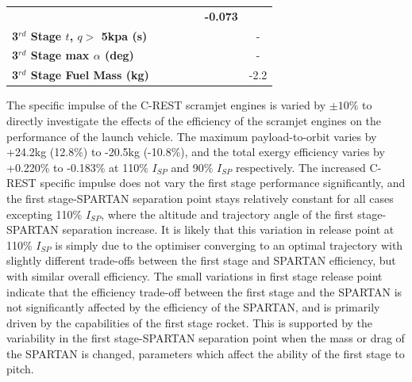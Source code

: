 \begin{table}[ht!]
\begin{tabular}{l c c c c c c}
		& \textbf{\thirddExergyEffIspNinetyFiveNoReturn}
		& \textbf{\thirddExergyEffIspStandardNoReturn}
		& \textbf{\thirddExergyEffIspOneHundredFiveNoReturn}
		& \textbf{\thirddExergyEffIspOneHundredTenNoReturn}
		& \textbf{-0.073}
		\\
		\textbf{3$^{rd}$ Stage $t$, $q >$ 5kpa (s)}
		& \thirdqOverFiveIspNinetyNoReturn
		& \thirdqOverFiveIspNinetyFiveNoReturn
		& \thirdqOverFiveIspStandardNoReturn
		& \thirdqOverFiveIspOneHundredFiveNoReturn
		& \thirdqOverFiveIspOneHundredTenNoReturn
		& -
		\\
		\textbf{3$^{rd}$ Stage max $\alpha$ (deg)}
		& \thirdmaxAoAIspNinetyNoReturn
		& \thirdmaxAoAIspNinetyFiveNoReturn
		& \thirdmaxAoAIspStandardNoReturn
		& \thirdmaxAoAIspOneHundredFiveNoReturn
		& \thirdmaxAoAIspOneHundredTenNoReturn
		& -
		\\
		\textbf{3$^{rd}$ Stage Fuel Mass (kg)}
		& \thirdmFuelIspNinetyNoReturn
		& \thirdmFuelIspNinetyFiveNoReturn
		& \thirdmFuelIspStandardNoReturn
		& \thirdmFuelIspOneHundredFiveNoReturn
		& \thirdmFuelIspOneHundredTenNoReturn
		&-2.2
		\\
		\hline 
	\end{tabular} 
	
\end{table}

The specific impulse of the C-REST scramjet engines is varied by $\pm10\%$ to directly investigate the effects of the efficiency of the scramjet engines on the performance of the launch vehicle. The maximum payload-to-orbit varies by +24.2kg (12.8\%) to -20.5kg (-10.8\%), and the total exergy efficiency varies by +0.220\% to -0.183\% at 110\% $I_{SP}$ and 90\% $I_{SP}$ respectively. 
The increased C-REST specific impulse does not vary the first stage performance significantly, and the first stage-SPARTAN separation point stays relatively constant for all cases excepting 110\% $I_{SP}$, where the altitude and trajectory angle of the first stage-SPARTAN separation increase. It is likely that this variation in release point at 110\% $I_{SP}$ is simply due to the optimiser converging to an optimal trajectory with slightly different trade-offs between the first stage and SPARTAN efficiency, but with similar overall efficiency.  
The small variations in first stage release point indicate that the efficiency trade-off between the first stage and the SPARTAN is not significantly affected by the efficiency of the SPARTAN, and is primarily driven by the capabilities of the first stage rocket. 
This is supported by the variability in the first stage-SPARTAN separation point when the mass or drag of the SPARTAN is changed, parameters which affect the ability of the first stage to pitch. 

